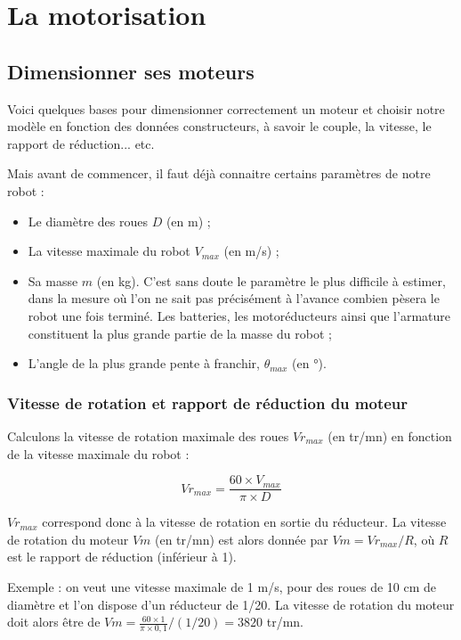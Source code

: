 \documentclass[a4paper]{article}
\begin{document}
\section{La motorisation}

\subsection{Dimensionner ses moteurs}

Voici quelques bases pour dimensionner correctement un moteur et choisir notre modèle en fonction des données constructeurs, à savoir le couple, la vitesse, le rapport de réduction... etc.

Mais avant de commencer, il faut déjà connaitre certains paramètres de notre robot :

\begin{itemize}
	\item Le diamètre des roues $D$ (en m) ;
	\item La vitesse maximale du robot $V_{max}$ (en m/s) ;
	\item Sa masse $m$ (en kg). C'est sans doute le paramètre le plus difficile à estimer, dans la mesure où l'on ne sait pas précisément à l'avance combien pèsera le robot une fois terminé. Les batteries, les motoréducteurs ainsi que l'armature constituent la plus grande partie de la masse du robot ;	
	\item L'angle de la plus grande pente à franchir, $\theta{}_{max}$ (en °).
\end{itemize}

\subsubsection{Vitesse de rotation et rapport de réduction du moteur}

Calculons la vitesse de rotation maximale des roues $Vr_{max}$ (en tr/mn) en fonction de la vitesse maximale du robot :

\[Vr_{max} = \frac{60 \times V_{max}}{\pi \times D}\]

$Vr_{max}$ correspond donc à la vitesse de rotation en sortie du réducteur. La vitesse de rotation du moteur $Vm$ (en tr/mn) est alors donnée par $Vm = Vr_{max} / R$, où $R$ est le rapport de réduction (inférieur à 1).

Exemple : on veut une vitesse maximale de 1 m/s, pour des roues de 10 cm de diamètre et l'on dispose d'un réducteur de 1/20\ieme{}. La vitesse de rotation du moteur doit alors être de $Vm = \frac{60 \times 1}{\pi \times 0,1} / (1/20) = 3820$ tr/mn.
\end{document}
